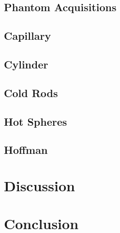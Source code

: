 \subsection{Phantom Acquisitions}
\subsection{Capillary}
\subsection{Cylinder}
\subsection{Cold Rods}
\subsection{Hot Spheres} 
\subsection{Hoffman}

\section{Discussion}

\section{Conclusion}